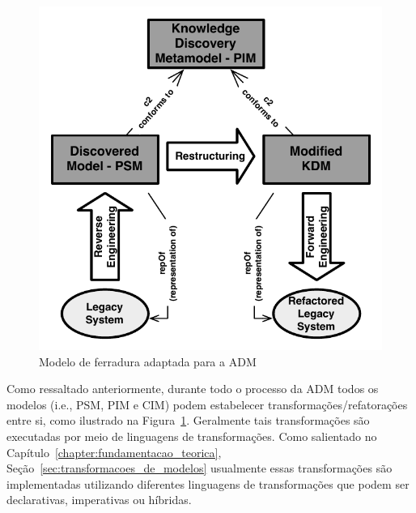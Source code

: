  \begin{figure}[htb]
 \caption{Modelo de ferradura adaptada para a ADM}
 \label{fig:horse_shoe}
 \centering
 \includegraphics[scale=0.8]{images/horseshoes.pdf}
\end{figure}

Como ressaltado anteriormente, durante todo o processo da ADM todos os modelos (i.e., PSM, PIM e CIM) podem estabelecer transformações/refatorações entre si, como ilustrado na Figura~\ref{fig:horse_shoe}. Geralmente tais transformações são executadas por meio de linguagens de transformações. Como salientado no Capítulo~\ref{chapter:fundamentacao_teorica}, Seção~\ref{sec:transformacoes_de_modelos} usualmente essas transformações são implementadas utilizando diferentes linguagens de transformações que podem ser declarativas, imperativas ou híbridas. 


